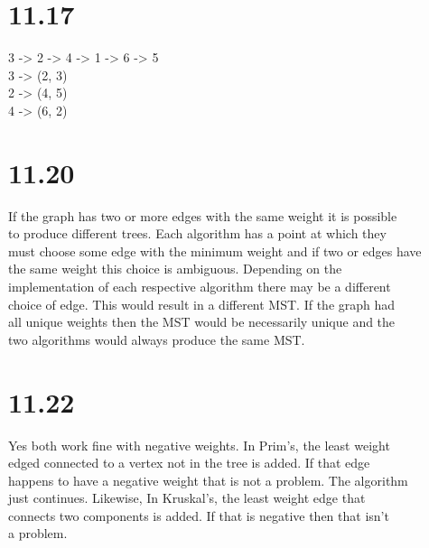 \documentclass[11pt]{article}
\begin{document}
\section{11.17}
\label{sec:orgc136b78}
3 -> 2 -> 4 -> 1 -> 6 -> 5\\
3 -> (2, 3)\\
2 -> (4, 5)\\
4 -> (6, 2)\\
\section{11.20}
\label{sec:org2b16aa7}
If the graph has two or more edges with the same weight it is possible\\
to produce different trees. Each algorithm has a point at which they\\
must choose some edge with the minimum weight and if two or edges have\\
the same weight this choice is ambiguous. Depending on the\\
implementation of each respective algorithm there may be a different\\
choice of edge. This would result in a different MST. If the graph had\\
all unique weights then the MST would be necessarily unique and the\\
two algorithms would always produce the same MST.\\
\section{11.22}
\label{sec:org8fee175}
Yes both work fine with negative weights. In Prim's, the least weight\\
edged connected to a vertex not in the tree is added. If that edge\\
happens to have a negative weight that is not a problem. The algorithm\\
just continues. Likewise, In Kruskal's, the least weight edge that\\
connects two components is added. If that is negative then that isn't\\
a problem.\\
\end{document}

